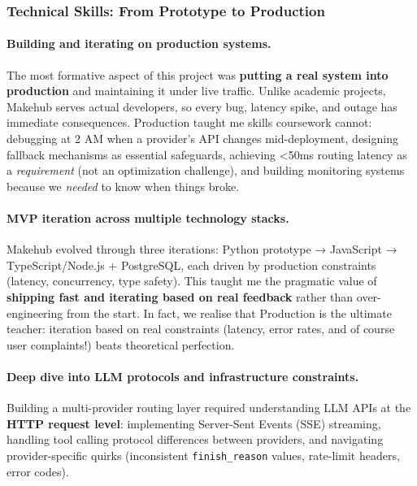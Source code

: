 \documentclass[english]{article}
\begin{document}
\subsubsection{Technical Skills: From Prototype to Production}

\paragraph{Building and iterating on production systems.}

The most formative aspect of this project was \textbf{putting a real system into production} and maintaining it under live traffic. Unlike academic projects, Makehub serves actual developers, so every bug, latency spike, and outage has immediate consequences. Production taught me skills coursework cannot: debugging at 2 AM when a provider's API changes mid-deployment, designing fallback mechanisms as essential safeguards, achieving <50ms routing latency as a \emph{requirement} (not an optimization challenge), and building monitoring systems because we \emph{needed} to know when things broke.

\paragraph{MVP iteration across multiple technology stacks.}

Makehub evolved through three iterations: Python prototype → JavaScript → TypeScript/Node.js + PostgreSQL, each driven by production constraints (latency, concurrency, type safety). This taught me the pragmatic value of \textbf{shipping fast and iterating based on real feedback} rather than over-engineering from the start. In fact, we realise that Production is the ultimate teacher: iteration based on real constraints (latency, error rates, and of course user complaints!) beats theoretical perfection.

\paragraph{Deep dive into LLM protocols and infrastructure constraints.}

Building a multi-provider routing layer required understanding LLM APIs at the \textbf{HTTP request level}: implementing Server-Sent Events (SSE) streaming, handling tool calling protocol differences between providers, and navigating provider-specific quirks (inconsistent \texttt{finish\_reason} values, rate-limit headers, error codes).
\end{document}
